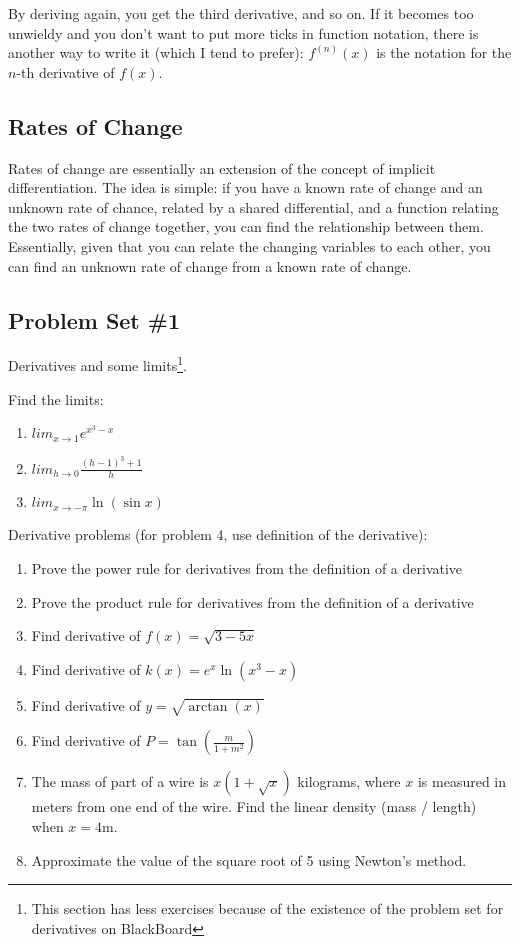 \documentclass[12pt]{amsart}
\begin{document}
By deriving again, you get the third derivative, and so on. If it becomes too unwieldy and you don't want to put more ticks in function notation, there is another way to write it (which I tend to prefer): $f^{(n)}(x)$ is the notation for the $n$-th derivative of $f(x)$.

\subsection{Rates of Change}

Rates of change are essentially an extension of the concept of implicit differentiation. The idea is simple: if you have a known rate of change and an unknown rate of chance, related by a shared differential, and a function relating the two rates of change together, you can find the relationship between them. Essentially, given that you can relate the changing variables to each other, you can find an unknown rate of change from a known rate of change.

\subsection{Problem Set \#1} Derivatives and some limits\footnote{This section has less exercises because of the existence of the problem set for derivatives on BlackBoard}.

Find the limits:
\begin{enumerate}
\item $lim_{x \to 1} e^{x^3-x}$
\item $lim_{h \to 0} \frac{(h-1)^3 + 1}{h}$
\item $lim_{x \to -\pi} \ln(\sin x)$ \\
\end{enumerate}
Derivative problems (for problem 4, use definition of the derivative):
\begin{enumerate}[resume]
\item Prove the power rule for derivatives from the definition of a derivative
\item Prove the product rule for derivatives from the definition of a derivative
\item Find derivative of $f(x) = \sqrt{3 - 5x}$
\item Find derivative of $k(x) = e^x\ln(x^3 - x)$
\item Find derivative of $y = \sqrt{\arctan(x)}$
\item Find derivative of $P = \tan(\frac{m}{1 + m^2})$
\item The mass of part of a wire is $x(1 + \sqrt{x})$ kilograms, where $x$ is measured in meters from one end of the wire. Find the linear density (mass / length) when $x = 4\text{m}$.
\item Approximate the value of the square root of 5 using Newton's method. 
\end{enumerate}
\end{document}
